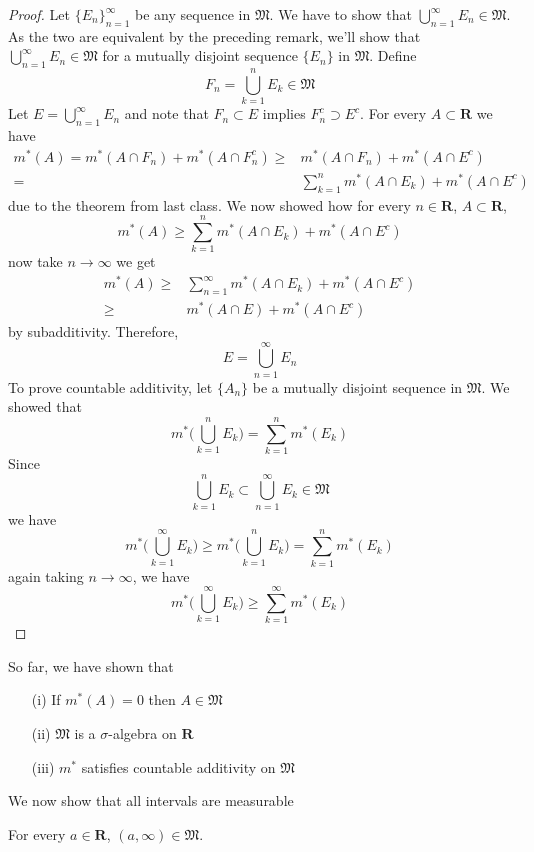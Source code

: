 \begin{proof}
Let $\{E_{n}\}_{n=1}^{\infty }$ be any sequence in $\mathfrak{M}$. We have to show that $\bigcup ^{\infty }_{n=1}E_{n}\in \mathfrak{M}$. As the two are equivalent by the preceding remark, we'll show that $\bigcup ^{\infty }_{n=1}E_{n}\in \mathfrak{M}$ for a mutually disjoint sequence $\{E_{n}\}$ in $\mathfrak{M}$. Define 
\[F_{n}=\bigcup ^{n}_{k=1}E_{k}\in \mathfrak{M}\]
Let $E=\bigcup ^{\infty }_{n=1}E_{n}$ and note that $F_{n}\subset E$ implies $F_{n}^{c}\supset E^{c}$. For every $A\subset {\bm R}$ we have
\begin{align*}
m^{*}(A)=m^{*}(A\cap F_{n})+m^{*}(A\cap F_{n}^{c})\geq & m^{*}(A\cap F_{n})+m^{*}(A\cap E^{c})\\
=&\sum ^{n}_{k=1}m^{*}(A\cap E_{k})+m^{*}(A\cap E^{c})
\end{align*}
due to the theorem from last class. We now showed how for every $n\in {\bm R}$, $A\subset {\bm R}$,
\[m^{*}(A)\geq \sum ^{n}_{k=1}m^{*}(A\cap E_{k})+m^{*}(A\cap E^{c})\]
now take $n\rightarrow \infty $ we get
\begin{align*}
	m^{*}(A)\geq& \sum ^{\infty }_{n=1}m^{*}(A\cap E_{k})+m^{*}(A\cap E^{c})\\
	\geq&m^{*}(A\cap E)+m^{*}(A\cap E^{c})
\end{align*}
by subadditivity. Therefore,
\[E=\bigcup ^{\infty }_{n=1}E_{n}\]
To prove countable additivity, let $\{A_{n}\}$ be a mutually disjoint sequence in $\mathfrak{M}$. We showed that
\[m^{*}\Big(\bigcup_{k=1}^{n}E_{k}\Big)=\sum ^{n}_{k=1}m^{*}(E_{k})\]
Since
\[\bigcup ^{n}_{k=1}E_{k}\subset \bigcup ^{\infty }_{n=1}E_{k}\in \mathfrak{M}\]
we have
\[m^{*}\Big(\bigcup _{k=1}^{\infty }E_{k}\Big)\geq m^{*}\Big(\bigcup ^{n}_{k=1}E_{k}\Big)=\sum ^{n}_{k=1}m^{*}(E_{k})\]
again taking $n\rightarrow \infty $, we have 
\[m^{*}\Big(\bigcup ^{\infty }_{k=1}E_{k}\Big)\geq \sum ^{\infty }_{k=1}m^{*}(E_{k})\]
\end{proof}
\vspace{2ex}
So far, we have shown that 
\begin{itemize}
	\item[(i)] If $m^{*}(A)=0$ then $A\in \mathfrak{M}$
	\item[(ii)] $\mathfrak{M}$ is a $\sigma $-algebra on ${\bm R}$
	\item[(iii)] $m^{*}$ satisfies countable additivity on $\mathfrak{M}$
\end{itemize}
We now show that all intervals are measurable 
\vspace{4ex}
\begin{thm}
For every $a\in {\bm R}$, $(a,\infty )\in\mathfrak{M}$.
\end{thm}
